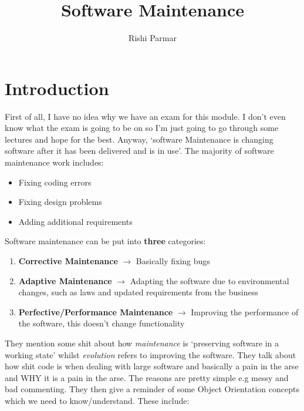 \documentclass{article}
\begin{document}
\title{Software Maintenance}
\author{Rishi Parmar}
\maketitle
\newpage
{}
\hypertarget{MyToc}{}
\tableofcontents
\newpage

\section{Introduction}
First of all, I have no idea why we have an exam for this module. I don't even know what the exam is going to be on so I'm just going to go through some lectures and hope for the best. Anyway, `software Maintenance is changing software after it has been delivered and is in use'. The majority of software maintenance work includes: 

\begin{itemize}
\item Fixing coding errors
\item Fixing design problems
\item Adding additional requirements
\end{itemize}

Software maintenance can be put into \textbf{three} categories:

\begin{enumerate}
\item \textbf{Corrective Maintenance} $\longrightarrow$ Basically fixing bugs
\item \textbf{Adaptive Maintenance} $\longrightarrow$ Adapting the software due to environmental changes, such as laws and updated requirements from the business
\item \textbf{Perfective/Performance Maintenance} $\longrightarrow$ Improving the performance of the software, this doesn't change functionality
\end{enumerate}

They mention some shit about how \emph{maintenance} is `preserving software in a working state' whilst \emph{evolution} refers to improving the software. They talk about how shit code is when dealing with large software and basically a pain in the arse and WHY it is a pain in the arse. The reasons are pretty simple e.g messy and bad commenting. They then give a reminder of some Object Orientation concepts which we need to know/understand. These include:
\end{document}

